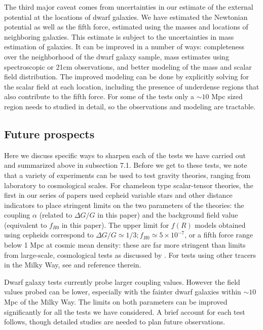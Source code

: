 \documentclass[twocolappendix, numberedappendix]{emulateapj}
\begin{document}
The third major caveat comes from uncertainties in our estimate of the 
external potential at the locations of dwarf galaxies. We have estimated the 
Newtonian potential as well as the fifth force, estimated using the masses 
and locations of neighboring galaxies. This estimate is subject to the 
uncertainties in mass estimation of galaxies. It can be improved in a number of 
ways: completeness over the neighborhood of the dwarf galaxy
sample, mass estimates using spectroscopic or 21cm observations, and better modeling of the mass and scalar field distribution. The improved modeling 
can be done by explicitly solving for the scalar field at each location, including the 
presence of underdense regions that also contribute to the fifth force. For some
of the tests only a $\sim 10$ Mpc sized region needs to studied in detail, so 
the observations and modeling are tractable. 

\subsection{Future prospects}
Here we discuss specific ways to sharpen each of the tests we have carried out and summarized above in subsection 7.1. Before we get to these tests, we note that a variety of experiments can be used to test gravity theories, ranging from laboratory to cosmological scales. For chameleon type scalar-tensor theories, the first in our series of papers \citep{jainvinu2012} used cepheid variable stars and other distance indicators to place stringent limits on the two parameters of the theories: the coupling $\alpha$ (related to $\Delta G/G$ in this paper) and the background field value (equivalent to $f_{R0}$ in this paper).  The upper limit for $f(R)$ models obtained using cepheids correspond to $\Delta G/G\simeq 1/3; f_{R0}\simeq 5\times10^{-7}$, or a fifth force range below 1 Mpc at cosmic mean density: these are far more stringent than limits from large-scale, cosmological tests as discussed by \citet{jainvinu2012}. For tests using other tracers in the Milky Way, see \citet{Brax2013} and reference therein. 

Dwarf galaxy tests currently probe larger coupling values. However the field values probed can be lower, especially with the fainter dwarf galaxies within $\sim 10$ Mpc of the Milky Way. The limits on both parameters can be improved significantly 
for all the tests we have considered. A brief account for each test follows, though 
detailed studies are needed to plan future observations.  
\end{document}
